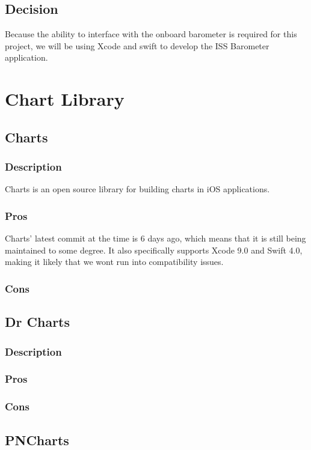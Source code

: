 \documentclass[onecolumn, draftclsnofoot,10pt, compsoc]{IEEEtran}
\begin{document}
\subsection{Decision}
Because the ability to interface with the onboard barometer is required for this project, we will be using Xcode and swift to develop the ISS Barometer application.

\section{Chart Library}

\subsection{Charts}
\subsubsection*{Description}
Charts is an open source library for building charts in iOS applications.

\subsubsection*{Pros}
Charts' latest commit at the time is 6 days ago, which means that it is still being maintained to some degree.
It also specifically supports Xcode 9.0 and Swift 4.0, making it likely that we wont run into compatibility issues.

\subsubsection*{Cons}

\subsection{Dr Charts}
\subsubsection*{Description}
\subsubsection*{Pros}
\subsubsection*{Cons}

\subsection{PNCharts}
\end{document}
